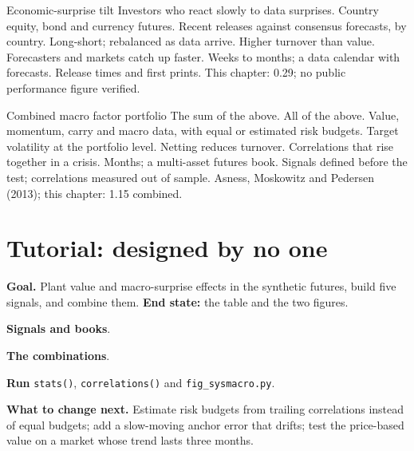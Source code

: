 \begin{strategyfile}{Economic-surprise tilt}\label{strat:s2:systematic-macro:surprise}
 Investors who react slowly to data surprises.
 Country equity, bond and currency futures.
 Recent releases against consensus forecasts, by country.
 Long-short; rebalanced as data arrive.
 Higher turnover than value.
 Forecasters and markets catch up faster.
 Weeks to months; a data calendar with forecasts.
 Release times and first prints.
 This chapter: 0.29; no public performance figure verified.
\end{strategyfile}

\begin{strategyfile}{Combined macro factor portfolio}\label{strat:s2:systematic-macro:combined}
 The sum of the above.
 All of the above.
 Value, momentum, carry and macro data, with equal or estimated risk budgets.
 Target volatility at the portfolio level.
 Netting reduces turnover.
 Correlations that rise together in a crisis.
 Months; a multi-asset futures book.
 Signals defined before the test; correlations measured out of sample.
 Asness, Moskowitz and Pedersen (2013); this chapter: 1.15 combined.
\end{strategyfile}

\section{Tutorial: designed by no one}\label{tut:s2:systematic-macro:tut}

\begin{tutorial}
\textbf{Goal.} Plant value and macro-surprise effects in the synthetic futures, build five signals, and combine them. \textbf{End state:} the table
and the two figures.
\begin{tutsteps}
\item \textbf{Signals and books}.
\label{lst:s2:systematic-macro:signals}
\item \textbf{The combinations}.
\label{lst:s2:systematic-macro:books}
\item \textbf{Run} \texttt{stats()}, \texttt{correlations()} and \texttt{fig\_sysmacro.py}.
\end{tutsteps}
\textbf{What to change next.} Estimate risk budgets from trailing correlations instead of equal budgets; add a slow-moving anchor error that drifts;
test the price-based value on a market whose trend lasts three months.
\end{tutorial}

